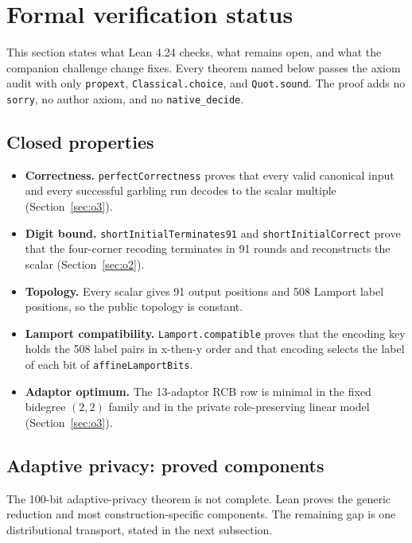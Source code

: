 \documentclass[10pt]{article}
\begin{document}
\section{Formal verification status}
\label{sec:formal}

This section states what Lean 4.24 checks, what remains open, and what the companion challenge change fixes.
Every theorem named below passes the axiom audit with only \texttt{propext}, \texttt{Classical.choice}, and \texttt{Quot.sound}.
The proof adds no \texttt{sorry}, no author axiom, and no \texttt{native\_decide}.

\subsection{Closed properties}

\begin{itemize}
  \item \textbf{Correctness.} \texttt{perfectCorrectness} proves that every valid canonical input and every successful garbling run decodes to the scalar multiple (Section~\ref{sec:o3}).
  \item \textbf{Digit bound.} \texttt{shortInitialTerminates91} and \texttt{shortInitialCorrect} prove that the four-corner recoding terminates in 91 rounds and reconstructs the scalar (Section~\ref{sec:o2}).
  \item \textbf{Topology.} Every scalar gives 91 output positions and 508 Lamport label positions, so the public topology is constant.
  \item \textbf{Lamport compatibility.} \texttt{Lamport.compatible} proves that the encoding key holds the 508 label pairs in x-then-y order and that encoding selects the label of each bit of \texttt{affineLamportBits}.
  \item \textbf{Adaptor optimum.} The 13-adaptor RCB row is minimal in the fixed bidegree $(2,2)$ family and in the private role-preserving linear model (Section~\ref{sec:o3}).
\end{itemize}

\subsection{Adaptive privacy: proved components}

The 100-bit adaptive-privacy theorem is not complete.
Lean proves the generic reduction and most construction-specific components.
The remaining gap is one distributional transport, stated in the next subsection.
\end{document}
